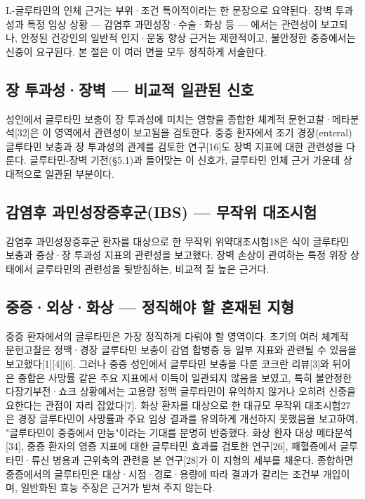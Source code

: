 \documentclass[12pt,oneside]{book}
\begin{document}
L-글루타민의 인체 근거는 부위·조건 특이적이라는 한 문장으로 요약된다. 장벽 투과성과 특정 임상 상황 — 감염후 과민성장·수술·화상 등 — 에서는 관련성이 보고되나, 안정된 건강인의 일반적 인지·운동 향상 근거는 제한적이고, 불안정한 중증에서는 신중이 요구된다. 본 절은 이 여러 면을 모두 정직하게 서술한다.

\subsection{장 투과성·장벽 — 비교적 일관된 신호}

성인에서 글루타민 보충이 장 투과성에 미치는 영향을 종합한 체계적 문헌고찰·메타분석[32]은 이 영역에서 관련성이 보고됨을 검토한다. 중증 환자에서 조기 경장(enteral) 글루타민 보충과 장 투과성의 관계를 검토한 연구[16]도 장벽 지표에 대한 관련성을 다룬다. 글루타민-장벽 기전(§5.1)과 들어맞는 이 신호가, 글루타민 인체 근거 가운데 상대적으로 일관된 부분이다.

\subsection{감염후 과민성장증후군(IBS) — 무작위 대조시험}

감염후 과민성장증후군 환자를 대상으로 한 무작위 위약대조시험18은 식이 글루타민 보충과 증상·장 투과성 지표의 관련성을 보고했다. 장벽 손상이 관여하는 특정 위장 상태에서 글루타민의 관련성을 뒷받침하는, 비교적 질 높은 근거다.

\subsection{중증·외상·화상 — 정직해야 할 혼재된 지형}

중증 환자에서의 글루타민은 가장 정직하게 다뤄야 할 영역이다. 초기의 여러 체계적 문헌고찰은 정맥·경장 글루타민 보충이 감염 합병증 등 일부 지표와 관련될 수 있음을 보고했다[1][4][6]. 그러나 중증 성인에서 글루타민 보충을 다룬 코크란 리뷰[3]와 뒤이은 종합은 사망률 같은 주요 지표에서 이득이 일관되지 않음을 보였고, 특히 불안정한 다장기부전·쇼크 상황에서는 고용량 정맥 글루타민이 유익하지 않거나 오히려 신중을 요한다는 관점이 자리 잡았다[7]. 화상 환자를 대상으로 한 대규모 무작위 대조시험27은 경장 글루타민이 사망률과 주요 임상 결과를 유의하게 개선하지 못했음을 보고하여, "글루타민이 중증에서 만능"이라는 기대를 분명히 반증했다. 화상 환자 대상 메타분석[34], 중증 환자의 염증 지표에 대한 글루타민 효과를 검토한 연구[26], 패혈증에서 글루타민·류신 병용과 근위축의 관련을 본 연구[28]가 이 지형의 세부를 채운다. 종합하면 중증에서의 글루타민은 대상·시점·경로·용량에 따라 결과가 갈리는 조건부 개입이며, 일반화된 효능 주장은 근거가 받쳐 주지 않는다.
\end{document}

